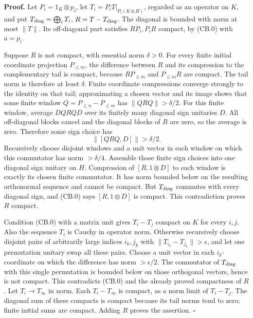\documentclass[
  11pt,
]{article}
\begin{document}
\textbf{Proof.} Let \(P_i=1_K\otimes p_i\), let
\(T_i=P_iT|_{P_i(K\otimes H)}\), regarded as an operator on \(K\), and
put \(T_{\rm diag}=\bigoplus_iT_i\), \(R=T-T_{\rm diag}\). The diagonal
is bounded with norm at most \(\|T\|\). Its off-diagonal part satisfies
\(RP_i,P_iR\) compact, by (CB.0) with \(a=p_i\).

Suppose \(R\) is not compact, with essential norm \(\delta>0\). For
every finite initial coordinate projection \(P_{\leq m}\), the
difference between \(R\) and its compression to the complementary tail
is compact, because \(RP_{\leq m}\) and \(P_{\leq m}R\) are compact. The
tail norm is therefore at least \(\delta\). Finite coordinate
compressions converge strongly to the identity on that tail;
approximating a chosen vector and its image shows that some finite
window \(Q=P_{\leq n}-P_{\leq m}\) has \(\|QRQ\|>\delta/2\). For this
finite window, average \(DQRQD\) over its finitely many diagonal sign
unitaries \(D\). All off-diagonal blocks cancel and the diagonal blocks
of \(R\) are zero, so the average is zero. Therefore some sign choice
has \[
 \|[QRQ,D]\|>\delta/2.
\] Recursively choose disjoint windows and a unit vector in each window
on which this commutator has norm \(>\delta/4\). Assemble those finite
sign choices into one diagonal sign unitary on \(H\). Compression of
\([R,1\otimes D]\) to each window is exactly its chosen finite
commutator. It has norm bounded below on the resulting orthonormal
sequence and cannot be compact. But \(T_{\rm diag}\) commutes with every
diagonal sign, and (CB.0) says \([R,1\otimes D]\) is compact. This
contradiction proves \(R\) compact.

Condition (CB.0) with a matrix unit gives \(T_i-T_j\) compact on \(K\)
for every \(i,j\). Also the sequence \(T_i\) is Cauchy in operator norm.
Otherwise recursively choose disjoint pairs of arbitrarily large indices
\(i_k,j_k\) with \(\|T_{i_k}-T_{j_k}\|>\epsilon\), and let one
permutation unitary swap all these pairs. Choose a unit vector in each
\(i_k\)-coordinate on which the difference has norm \(>\epsilon/2\). The
commutator of \(T_{\rm diag}\) with this single permutation is bounded
below on those orthogonal vectors, hence is not compact. This
contradicts (CB.0) and the already proved compactness of \(R\). Let
\(T_i\to T_\infty\) in norm. Each \(T_i-T_\infty\) is compact, as a norm
limit of \(T_i-T_j\). The diagonal sum of these compacts is compact
because its tail norms tend to zero; finite initial sums are compact.
Adding \(R\) proves the assertion. \(\square\)
\end{document}
